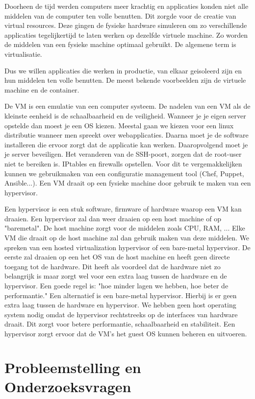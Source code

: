 \documentclass[pdftex,a4paper,12pt,twoside]{report}
\begin{document}
Doorheen de tijd werden computers meer krachtig en applicaties konden niet alle middelen van de computer ten volle benutten. Dit zorgde voor de creatie van virtual resources. Deze gingen de fysieke hardware simuleren om zo verschillende applicaties tegelijkertijd te laten werken op dezelfde virtuele machine. Zo worden de middelen van een fysieke machine optimaal gebruikt. De algemene term is virtualisatie.

Dus we willen applicaties die werken in productie, van elkaar geisoleerd zijn en hun middelen ten volle benutten. De meest bekende voorbeelden zijn de virtuele machine en de container.

De VM is een emulatie van een computer systeem. De nadelen van een VM als de kleinste eenheid is de schaalbaarheid en de veiligheid. Wanneer je je eigen server opstelde dan moest je een OS kiezen. Meestal gaan we kiezen voor een linux distributie wanneer men spreekt over webapplicaties. Daarna moet je de software installeren die ervoor zorgt dat de applicatie kan werken. Daaropvolgend moet je je server beveiligen. Het veranderen van de SSH-poort, zorgen dat de root-user niet te bereiken is. IPtables en firewalls opstellen. Voor dit te vergemakkelijken kunnen we gebruikmaken van een configuratie management tool (Chef, Puppet, Ansible...). Een VM draait op een fysieke machine door gebruik te maken van een hypervisor. 

Een hypervisor is een stuk software, firmware of hardware waarop een VM kan draaien. Een hypervisor zal dan weer draaien op een host machine of op "baremetal". De host machine zorgt voor de middelen zoals CPU, RAM, ... Elke VM die draait op de host machine zal dan gebruik maken van deze middelen. We spreken van een hosted virtualization hypervisor of een bare-metal hypervisor. De eerste zal draaien op een het OS van de host machine en heeft geen directe toegang tot de hardware. Dit heeft als voordeel dat de hardware niet zo belangrijk is maar zorgt wel voor een extra laag tussen de hardware en de hypervisor. Een goede regel is: "hoe minder lagen we hebben, hoe beter de performantie." Een alternatief is een bare-metal hypervisor. Hierbij is er geen extra laag tussen de hardware en hypervisor. We hebben geen host operating system nodig omdat de hypervisor rechtstreeks op de interfaces van hardware draait. Dit zorgt voor betere performantie, schaalbaarheid en stabiliteit. Een hypervisor zorgt ervoor dat de VM's het guest OS kunnen beheren en uitvoeren.

\section{Probleemstelling en Onderzoeksvragen}
\label{sec:onderzoeksvragen}
\end{document}
